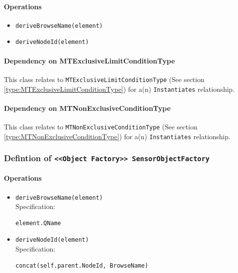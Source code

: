 \FloatBarrier



\paragraph{Operations}
\begin{itemize}
  \item \texttt{deriveBrowseName(element)}
  \item \texttt{deriveNodeId(element)}
\end{itemize}
\paragraph{Dependency on MTExclusiveLimitConditionType}

This class relates to \texttt{MTExclusiveLimitConditionType} (See section \ref{type:MTExclusiveLimitConditionType}) for a(n) \texttt{Instantiates} relationship.

\paragraph{Dependency on MTNonExclusiveConditionType}

This class relates to \texttt{MTNonExclusiveConditionType} (See section \ref{type:MTNonExclusiveConditionType}) for a(n) \texttt{Instantiates} relationship.

\FloatBarrier
\subsubsection{Defintion of \texttt{<<Object Factory>> SensorObjectFactory}} \label{type:SensorObjectFactory}

\FloatBarrier



\paragraph{Operations}
\begin{itemize}
  \item \texttt{deriveBrowseName(element)}\\
    Specification:
   \indent \begin{lstlisting}
element.QName
\end{lstlisting}

  \item \texttt{deriveNodeId(element)}\\
    Specification:
   \indent \begin{lstlisting}
concat(self.parent.NodeId, BrowseName)
\end{lstlisting}

\end{itemize}
